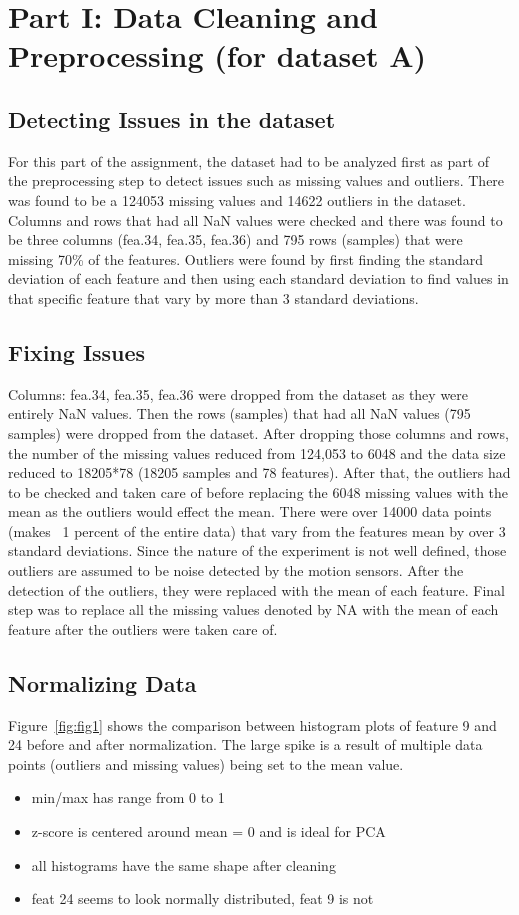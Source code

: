\section{Part I: Data Cleaning and Preprocessing (for dataset A)}
\subsection{Detecting Issues in the dataset}
For this part of the assignment, the dataset had to be analyzed first as part of the preprocessing step to detect issues such as missing values and outliers. There was found to be a 124053 missing values and 14622 outliers in the dataset. Columns and rows that had all NaN values were checked and there was found to be three columns (fea.34, fea.35, fea.36) and 795 rows (samples) that were missing 70\% of the features.
Outliers were found by first finding the standard deviation of each feature and then using each standard deviation to find values in that specific feature that vary by more than 3 standard deviations. 

\subsection{Fixing Issues}
Columns: fea.34, fea.35, fea.36 were dropped from the dataset as they were entirely NaN values. Then the rows (samples) that had all NaN values (795 samples) were dropped from the dataset. After dropping those columns and rows, the number of the missing values reduced from 124,053 to 6048 and the data size reduced to 18205*78 (18205 samples and 78 features). 
After that, the outliers had to be checked and taken care of before replacing the 6048 missing values with the mean as the outliers would effect the mean. There were over 14000 data points (makes ~1 percent of the entire data) that vary from the features mean by over 3 standard deviations. Since the nature of the experiment is not well defined, those outliers are assumed to be noise detected by the motion sensors. After the detection of the outliers, they were replaced with the mean of each feature. Final step was to replace all the missing values denoted by NA with the mean of each feature after the outliers were taken care of. 

\subsection{Normalizing Data}
Figure~\ref{fig:fig1} shows the comparison between histogram plots of feature 9 and 24 before and after normalization. The large spike is a result of multiple data points (outliers and missing values) being set to the mean value.
\begin{itemize}
\item min/max has range from 0 to 1
\item z-score is centered around mean = 0 and is ideal for PCA
\item all histograms have the same shape after cleaning
\item feat 24 seems to look normally distributed, feat 9 is not
\end{itemize}


